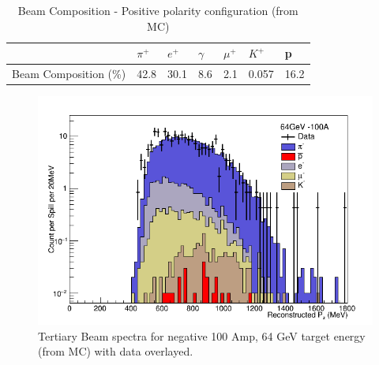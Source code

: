 \begin{table}[ht!]
\centering
\begin{tabular}{|l|l|l|l|l|l|l|}
\hline
                   & $\pi^+$ & $e^+$ & $\gamma$ & $\mu^+$ & $K^+$ & p \\ \hline
Beam Composition (\%) &    42.8     &  30.1     &    8.6      &    2.1     &    0.057    &    16.2            \\ \hline
\end{tabular}
\caption{Beam Composition - Positive polarity configuration (from MC)}
\label{tab:beamcomp2}
\end{table}



\begin{figure}[htb]
\begin{center}
\includegraphics[scale=0.45]{./images/BeamSpectrumExample.png}
\end{center}
\caption{Tertiary Beam spectra for negative 100 Amp, 64 GeV target energy (from MC) with data overlayed.}
\label{fig:beamspectrum}
\end{figure}
